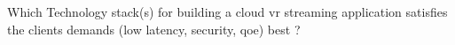  Which Technology stack(s) for building a cloud \acrfull{vr} streaming application satisfies the clients demands (low latency, security, \acrshort{qoe}) best ?